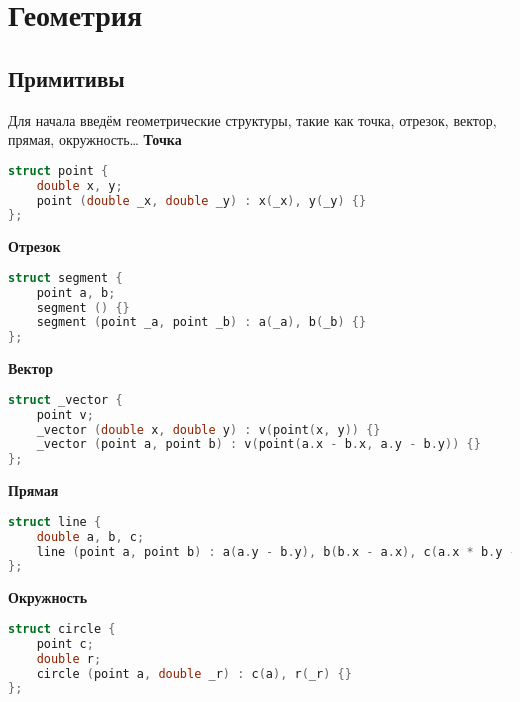 \chapter{Геометрия}
\section{Примитивы}
Для начала введём геометрические структуры, такие как точка, отрезок, вектор, прямая, окружность…\newline
\textbf{Точка}\newline
\begin{lstlisting}[language=C++]
struct point {
    double x, y;
    point (double _x, double _y) : x(_x), y(_y) {}
};
\end{lstlisting}
\textbf{Отрезок}
\begin{lstlisting}[language=C++]
struct segment {
    point a, b;
    segment () {}
    segment (point _a, point _b) : a(_a), b(_b) {}
};
\end{lstlisting}
\textbf{Вектор}
\begin{lstlisting}[language=C++]
struct _vector {
    point v;
    _vector (double x, double y) : v(point(x, y)) {}
    _vector (point a, point b) : v(point(a.x - b.x, a.y - b.y)) {}
};
\end{lstlisting}
\textbf{Прямая}
\begin{lstlisting}[language=C++]
struct line {
    double a, b, c;
    line (point a, point b) : a(a.y - b.y), b(b.x - a.x), c(a.x * b.y - b.x * a.y) {}
};
\end{lstlisting}
\textbf{Окружность}
\begin{lstlisting}[language=C++]
struct circle {
    point c;
    double r;
    circle (point a, double _r) : c(a), r(_r) {}
};
\end{lstlisting}

